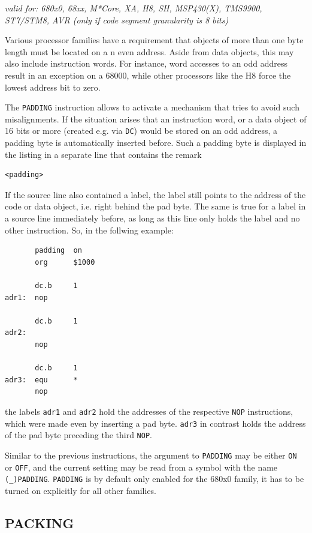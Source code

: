 \documentclass[12pt,twoside]{report}
\makeatletter
\newcommand{\tty}[1]{{\tt #1}}
\newcommand{\ttindex}[1]{\index{#1@{\tt #1}}}
\newcommand{\predefsym}[1]{{\tt (\_)#1}}
\makeatother
\begin{document}
{\em valid for: 680x0, 68xx, M*Core, XA, H8, SH, MSP430(X), TMS9900,\\
      ST7/STM8, AVR (only if code segment granularity is 8 bits)}

Various processor families have a requirement that objects of more than
one byte length must be located on a n even address.  Aside from data
objects, this may also include instruction words.  For instance, word
accesses to an odd address result in an exception on a 68000, while other
processors like the H8 force the lowest address bit to zero.

The \tty{PADDING} instruction allows to activate a mechanism that tries to
avoid such misalignments.  If the situation arises that an instruction
word, or a data object of 16 bits or more (created e.g. via \tty{DC}) would
be stored on an odd address, a padding byte is automatically inserted before.
Such a padding byte is displayed in the listing in a separate line that
contains the remark
\begin{verbatim}
<padding>
\end{verbatim}
If the source line also contained a label, the label still points to the
address of the code or data object, i.e. right behind the pad byte.  The same
is true for a label in a source line immediately before, as long as this
line {\em} only holds the label and no other instruction.  So, in the
follwing example:
\begin{verbatim}
       padding  on
       org      $1000

       dc.b     1
adr1:  nop

       dc.b     1
adr2:
       nop

       dc.b     1
adr3:  equ      *
       nop
\end{verbatim}
the labels \tty{adr1} and \tty{adr2} hold the addresses of the respective
\tty{NOP} instructions, which were made even by inserting a pad byte.
\tty{adr3} in contrast holds the address of the pad byte preceding the
third \tty{NOP}.

Similar to the previous instructions, the argument to \tty{PADDING} may be
either \tty{ON} or \tty{OFF}, and the current setting may be read from a
symbol with the name \predefsym{PADDING}.  \tty{PADDING} is by default only enabled for
the 680x0 family, it has to be turned on explicitly for all other families.


\subsection{PACKING}
\ttindex{PACKING}\label{SectPACKING}
\end{document}
